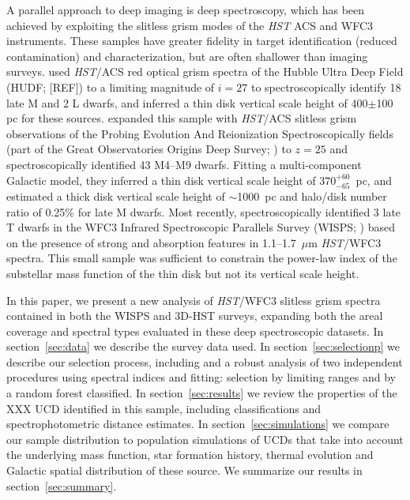 \documentclass[manuscript]{aastex63}
\begin{document}
A parallel approach to deep imaging is deep spectroscopy, which has been achieved by exploiting the slitless grism modes of the {\em HST} ACS and WFC3 instruments. These samples have greater fidelity in target identification (reduced contamination) and characterization, but are often shallower than imaging surveys.
\citet{2005ApJ...622..319P} used {\em HST}/ACS red optical grism spectra of the
Hubble Ultra Deep Field (HUDF; [REF]) to a limiting magnitude of $i = 27$ to spectroscopically
identify 18 late M and 2 L dwarfs, and 
inferred a thin disk vertical scale height of 400$\pm$100 pc for these sources. 
\citet{2009ApJ...695.1591P} expanded this sample with {\em HST}/ACS slitless grism observations of the Probing Evolution And Reionization Spectroscopically fields (part of the Great Observatories Origins Deep Survey;  \citealt{Giavalisco2004}) to $z = 25$ and spectroscopically identified 43 M4--M9 dwarfs. 
Fitting a multi-component Galactic model, they inferred a thin disk vertical scale height of 370$^{+60}_{-65}$~pc, and estimated a thick disk vertical scale height of $\sim$1000~pc and halo/disk number ratio of 0.25\% for late M dwarfs.
Most recently, \citet{2012ApJ...752L..14M} spectroscopically identified 3 late T dwarfs in the WFC3 Infrared Spectroscopic Parallels Survey (WISPS; \citep{2010ApJ...723..104A}) based on the presence of strong {\meth} and {\wat} absorption features in 1.1--1.7~$\mu$m {\em HST}/WFC3 spectra. This small sample was sufficient to constrain the power-law index of the substellar mass function of the thin disk but not its vertical scale height.

In this paper, we present a new analysis of {\em HST}/WFC3 slitless grism spectra contained in both the WISPS and 3D-HST \citep{Momcheva2016,2012ApJS..200...13B,Skelton2014} surveys, expanding both the areal coverage and spectral types evaluated in these deep spectroscopic datasets.
In section~\ref{sec:data} we describe the survey data used.
In section~\ref{sec:selectionp} we describe our selection process, including 
and a robust analysis of two independent procedures using spectral indices and fitting:
selection by limiting ranges and by a random forest classified.
In section~\ref{sec:results} we review the properties of the XXX UCD identified in this sample, including
classifications and spectrophotometric distance estimates.
In section~\ref{sec:simulations} we compare our sample distribution to population simulations of UCDs
that take into account the underlying mass function, star formation history, thermal evolution
and Galactic spatial distribution of these source. 
We summarize our results in section~\ref{sec:summary}.
\end{document}
